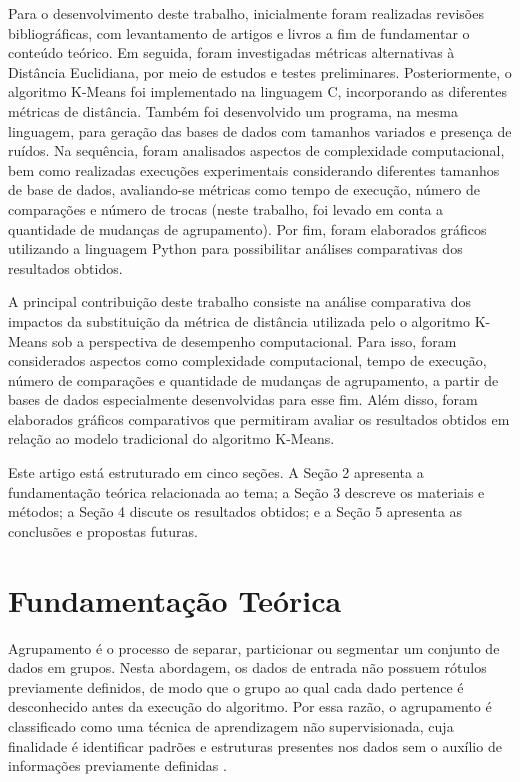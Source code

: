 \documentclass[10pt,a4paper,twocolumn]{article}
\begin{document}
Para o desenvolvimento deste trabalho, inicialmente foram realizadas revisões bibliográficas, com levantamento de artigos e livros a fim de fundamentar o conteúdo teórico. Em seguida, foram investigadas métricas alternativas à Distância Euclidiana, por meio de estudos e testes preliminares. Posteriormente, o algoritmo K-Means foi implementado na linguagem C, incorporando as diferentes métricas de distância. Também foi desenvolvido um programa, na mesma linguagem, para geração das bases de dados com tamanhos variados e presença de ruídos. Na sequência, foram analisados aspectos de complexidade computacional, bem como realizadas execuções experimentais considerando diferentes tamanhos de base de dados, avaliando-se métricas como tempo de execução, número de comparações e número de trocas (neste trabalho, foi levado em conta a quantidade de mudanças de agrupamento). Por fim, foram elaborados gráficos utilizando a linguagem Python para possibilitar análises comparativas dos resultados obtidos.

A principal contribuição deste trabalho consiste na análise comparativa dos impactos da substituição da métrica de distância utilizada pelo o algoritmo K-Means sob a perspectiva de desempenho computacional. Para isso, foram considerados aspectos como complexidade computacional, tempo de execução, número de comparações e quantidade de mudanças de agrupamento, a partir de bases de dados especialmente desenvolvidas para esse fim. Além disso, foram elaborados gráficos comparativos que permitiram avaliar os resultados obtidos em relação ao modelo tradicional do algoritmo K-Means.

Este artigo está estruturado em cinco seções. A Seção 2 apresenta a fundamentação teórica relacionada ao tema; a Seção 3 descreve os materiais e métodos; a Seção 4 discute os resultados obtidos; e a Seção 5 apresenta as conclusões e propostas futuras.
 
\section{Fundamentação Teórica}

Agrupamento é o processo de separar, particionar ou segmentar um conjunto de dados em grupos. Nesta abordagem, os dados de entrada não possuem rótulos previamente definidos, de modo que o grupo ao qual cada dado pertence é desconhecido antes da execução do algoritmo. Por essa razão, o agrupamento é classificado como uma técnica de aprendizagem não supervisionada, cuja finalidade é identificar padrões e estruturas presentes nos dados sem o auxílio de informações previamente definidas \cite{Ferrari2016}. 
\end{document}

